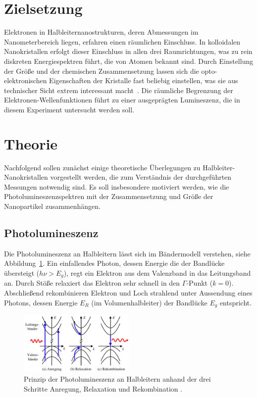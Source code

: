 \setcounter{page}{1}
\section*{Zielsetzung}
Elektronen in Halbleiternanostrukturen, deren Abmessungen im Nanometerbereich liegen,
erfahren einen räumlichen Einschluss. In kolloidalen Nanokristallen erfolgt dieser Einschluss
in allen drei Raumrichtungen, was zu rein diskreten Energiespektren führt, die von Atomen bekannt sind.
Durch Einstellung der Größe und der chemischen Zusammensetzung lassen sich die opto-elektronischen
Eigenschaften der Kristalle fast beliebig einstellen, was sie aus technischer Sicht extrem interessant macht~\cite{dissArens}.
Die räumliche Begrenzung der Elektronen-Wellenfunktionen führt zu einer ausgeprägten Lumineszenz, die
in diesem Experiment untersucht werden soll.

\section{Theorie}
\label{sec:theo}
Nachfolgend sollen zunächst einige theoretische Überlegungen zu Halbleiter-Nanokristallen vorgestellt werden, die
zum Verständnis der durchgeführten Messungen notwendig sind. Es soll insbesondere motiviert werden, wie die
Photolumineszenzspektren mit der Zusammensetzung und Größe der Nanopartikel zusammenhängen.

\subsection{Photolumineszenz}
Die Photolumineszenz an Halbleitern lässt sich im Bändermodell verstehen, siehe Abbildung~\ref{fig: pl}. Ein
einfallendes Photon, dessen Energie die der Bandlücke übersteigt ($h\nu > E_g$), regt ein Elektron aus dem
Valenzband in das Leitungsband an.
Durch Stöße relaxiert das Elektron sehr schnell in den $\Gamma$-Punkt ($k = 0$). Abschließend rekombinieren Elektron und Loch
strahlend unter Aussendung eines Photons, dessen Energie $E_R$ (im Volumenhalbleiter) der Bandlücke $E_g$ entspricht.

\begin{figure}
  \centering
  \includegraphics[width = 0.5\textwidth]{pics/PL.png}
  \caption{Prinzip der Photolumineszenz an Halbleitern anhand der drei Schritte Anregung, Relaxation und Rekombination \cite{anleitung_pl}.}
  \label{fig: pl}
\end{figure}


